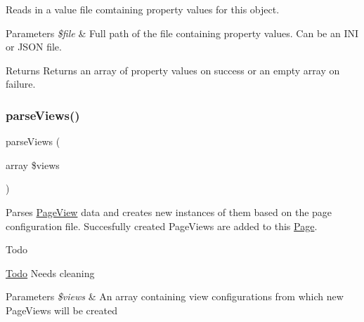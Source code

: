 Reads in a value file comtaining property values for this object. 
\begin{DoxyParams}{Parameters}
{\em \$file} & Full path of the file containing property values. Can be an I\+NI or J\+S\+ON file. \\
\hline
\end{DoxyParams}
\begin{DoxyReturn}{Returns}
Returns an array of property values on success or an empty array on failure. 
\end{DoxyReturn}

\mbox{\label{class_lora_1_1_page_a49b28f2ca7604e14af0d5829b4e8cc4a}} 
\subsubsection{\texorpdfstring{parse\+Views()}{parseViews()}}
{\footnotesize\ttfamily parse\+Views (\begin{DoxyParamCaption}\item[{array}]{\$views }\end{DoxyParamCaption})\hspace{0.3cm}{\ttfamily [private]}}

Parses \hyperlink{class_lora_1_1_page_view}{Page\+View} data and creates new instances of them based on the page configuration file. Succesfully created Page\+Views are added to this \hyperlink{class_lora_1_1_page}{Page}. \begin{DoxyRefDesc}{Todo}
\item[\hyperlink{todo__todo000008}{Todo}]Needs cleaning \end{DoxyRefDesc}

\begin{DoxyParams}{Parameters}
{\em \$views} & An array containing view configurations from which new Page\+Views will be created \\
\hline
\end{DoxyParams}

